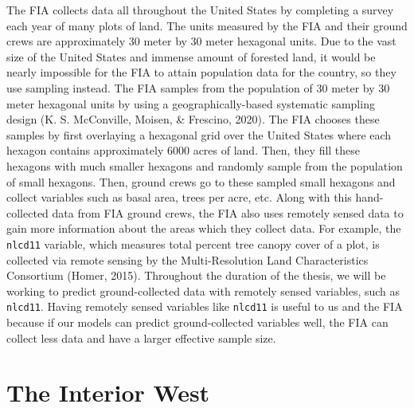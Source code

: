 \documentclass[12pt,twoside]{reedthesis}
\begin{document}
The FIA collects data all throughout the United States by completing a survey each year of many plots of land. The units measured by the FIA and their ground crews are approximately 30 meter by 30 meter hexagonal units. Due to the vast size of the United States and immense amount of forested land, it would be nearly impossible for the FIA to attain population data for the country, so they use sampling instead. The FIA samples from the population of 30 meter by 30 meter hexagonal units by using a geographically-based systematic sampling design (K. S. McConville, Moisen, \& Frescino, 2020). The FIA chooses these samples by first overlaying a hexagonal grid over the United States where each hexagon contains approximately 6000 acres of land. Then, they fill these hexagons with much smaller hexagons and randomly sample from the population of small hexagons. Then, ground crews go to these sampled small hexagons and collect variables such as basal area, trees per acre, etc. Along with this hand-collected data from FIA ground crews, the FIA also uses remotely sensed data to gain more information about the areas which they collect data. For example, the \texttt{nlcd11} variable, which measures total percent tree canopy cover of a plot, is collected via remote sensing by the Multi-Resolution Land Characteristics Consortium (Homer, 2015). Throughout the duration of the thesis, we will be working to predict ground-collected data with remotely sensed variables, such as \texttt{nlcd11}. Having remotely sensed variables like \texttt{nlcd11} is useful to us and the FIA because if our models can predict ground-collected variables well, the FIA can collect less data and have a larger effective sample size.

\hypertarget{the-interior-west}{%
\section{The Interior West}\label{the-interior-west}}
\end{document}
